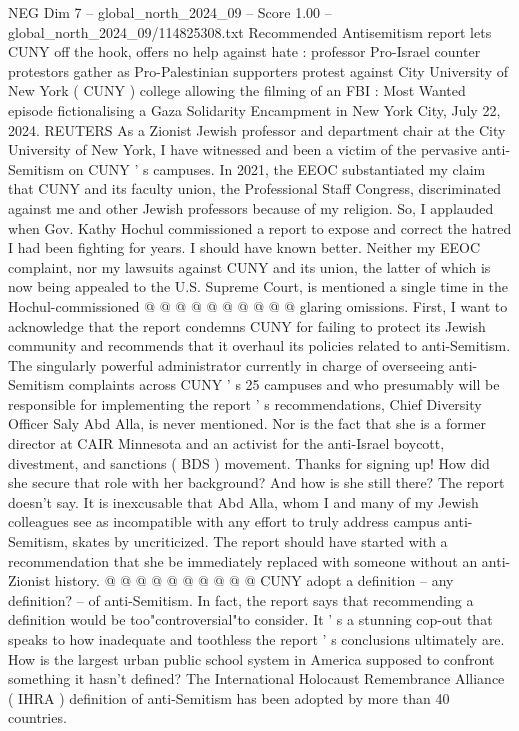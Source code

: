 \begin{textsample}{NEG Dim 7 – global\_north\_2024\_09 – Score 1.00 – global\_north\_2024\_09/114825308.txt}  \label{ex:f7_neg_385}
Recommended Antisemitism report lets CUNY off the hook, offers no help against hate : professor Pro-Israel counter protestors gather as Pro-Palestinian supporters protest against City University of New York ( CUNY ) college allowing the filming of an FBI : Most Wanted episode fictionalising a Gaza Solidarity Encampment in New York City, July 22, 2024.
REUTERS As a Zionist Jewish professor and department chair at the City University of New York, I have witnessed and been a victim of the pervasive anti-Semitism on CUNY ' s campuses.
In 2021, the EEOC substantiated my claim that CUNY and its faculty union, the Professional Staff Congress, discriminated against me and other Jewish professors because of my religion.
So, I applauded when Gov.
Kathy Hochul commissioned a report to expose and correct the hatred I had been fighting for years.
I should have known better.
Neither my EEOC complaint, nor my lawsuits against CUNY and its union, the latter of which is now being appealed to the U.S.
Supreme Court, is mentioned a single time in the Hochul-commissioned @ @ @ @ @ @ @ @ @ @ glaring omissions.
First, I want to acknowledge that the report condemns CUNY for failing to protect its Jewish community and recommends that it overhaul its policies related to anti-Semitism.
The singularly powerful administrator currently in charge of overseeing anti-Semitism complaints across CUNY ' s 25 campuses and who presumably will be responsible for implementing the report ' s recommendations, Chief Diversity Officer Saly Abd Alla, is never mentioned.
Nor is the fact that she is a former director at CAIR Minnesota and an activist for the anti-Israel boycott, divestment, and sanctions ( BDS ) movement.
Thanks for signing up!
How did she secure that role with her background?
And how is she still there?
The report doesn't say.
It is inexcusable that Abd Alla, whom I and many of my Jewish colleagues see as incompatible with any effort to truly address campus anti-Semitism, skates by uncriticized.
The report should have started with a recommendation that she be immediately replaced with someone without an anti-Zionist history. @ @ @ @ @ @ @ @ @ @ CUNY adopt a definition -- any definition? -- of anti-Semitism.
In fact, the report says that recommending a definition would be too"controversial"to consider.
It ' s a stunning cop-out that speaks to how inadequate and toothless the report ' s conclusions ultimately are.
How is the largest urban public school system in America supposed to confront something it hasn't defined?
The International Holocaust Remembrance Alliance ( IHRA ) definition of anti-Semitism has been adopted by more than 40 countries.

\end{textsample}
